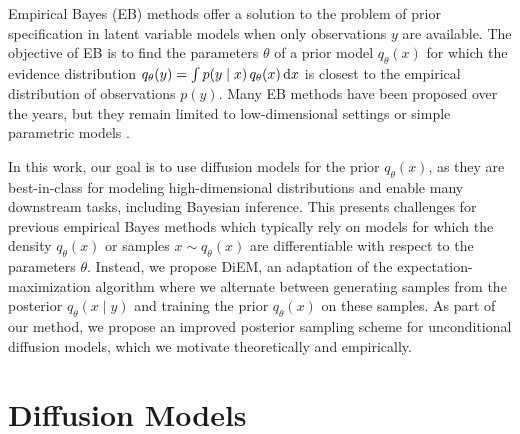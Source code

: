 Empirical Bayes (EB) methods \cite{robbins1956empirical, casella1985introduction, carlin2000empirical, efron2014two} offer a solution to the problem of prior specification in latent variable models when only observations $y$ are available. The objective of EB is to find the parameters $\theta$ of a prior model $q_\theta(x)$ for which the evidence distribution $q_\theta(y) = \int p(y \mid x) \, q_\theta(x) \operatorname{d}\!{x}$ is closest to the empirical distribution of observations $p(y)$. Many EB methods have been proposed over the years, but they remain limited to low-dimensional settings \cite{dagostini1995multidimensional, dockhorn2020density, andreassen2020omnifold, louppe2019adversarial, vandegar2021neural, vetter2024sourcerer} or simple parametric models \cite{efron2016empirical, narasimhan2020deconvolver}.

In this work, our goal is to use diffusion models for the prior $q_\theta(x)$, as they are best-in-class for modeling high-dimensional distributions and enable many downstream tasks, including Bayesian inference. This presents challenges for previous empirical Bayes methods which typically rely on models for which the density $q_\theta(x)$ or samples $x \sim q_\theta(x)$ are differentiable with respect to the parameters $\theta$. Instead, we propose DiEM, an adaptation of the expectation-maximization \cite{hartley1958maximum, dempster1977maximum, wu1983convergence, mclachlan2007em, balakrishnan2017statistical} algorithm where we alternate between generating samples from the posterior $q_\theta(x \mid y)$ and training the prior $q_\theta(x)$ on these samples. As part of our method, we propose an improved posterior sampling scheme for unconditional diffusion models, which we motivate theoretically and empirically.

\section{Diffusion Models} \label{sec:diem-diffusion}

